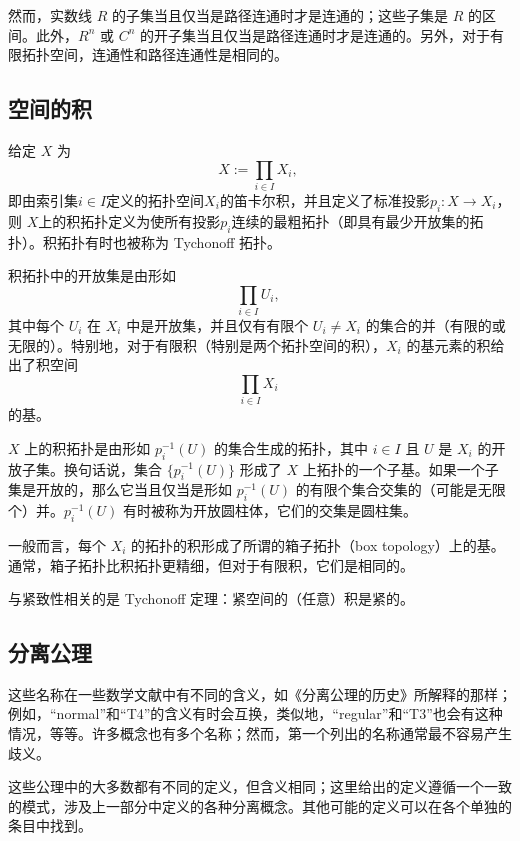 然而，实数线 $R$ 的子集当且仅当是路径连通时才是连通的；这些子集是 $R$ 的区间。此外，$R^n$ 或 $C^n$ 的开子集当且仅当是路径连通时才是连通的。另外，对于有限拓扑空间，连通性和路径连通性是相同的。
\subsection{空间的积}
给定 $X$ 为
$$
X := \prod_{i \in I} X_i,~
$$
即由索引集$i \in I$定义的拓扑空间$X_i$的笛卡尔积，并且定义了标准投影$p_i : X \to X_i$，则 $X$上的积拓扑定义为使所有投影$p_i$连续的最粗拓扑（即具有最少开放集的拓扑）。积拓扑有时也被称为 Tychonoff 拓扑。

积拓扑中的开放集是由形如
$$
\prod_{i \in I} U_i,~
$$
其中每个 $U_i$ 在 $X_i$ 中是开放集，并且仅有有限个 $U_i \neq X_i$ 的集合的并（有限的或无限的）。特别地，对于有限积（特别是两个拓扑空间的积），$X_i$ 的基元素的积给出了积空间
$$
\prod_{i \in I} X_i~
$$
的基。

$X$ 上的积拓扑是由形如 $p_i^{-1}(U)$ 的集合生成的拓扑，其中 $i \in I$ 且 $U$ 是 $X_i$ 的开放子集。换句话说，集合 $\{p_i^{-1}(U)\}$ 形成了 $X$ 上拓扑的一个子基。如果一个子集是开放的，那么它当且仅当是形如 $p_i^{-1}(U)$ 的有限个集合交集的（可能是无限个）并。$p_i^{-1}(U)$ 有时被称为开放圆柱体，它们的交集是圆柱集。

一般而言，每个 $X_i$ 的拓扑的积形成了所谓的箱子拓扑（box topology）上的基。通常，箱子拓扑比积拓扑更精细，但对于有限积，它们是相同的。

与紧致性相关的是 Tychonoff 定理：紧空间的（任意）积是紧的。
\subsection{分离公理}
这些名称在一些数学文献中有不同的含义，如《分离公理的历史》所解释的那样；例如，“normal”和“T4”的含义有时会互换，类似地，“regular”和“T3”也会有这种情况，等等。许多概念也有多个名称；然而，第一个列出的名称通常最不容易产生歧义。

这些公理中的大多数都有不同的定义，但含义相同；这里给出的定义遵循一个一致的模式，涉及上一部分中定义的各种分离概念。其他可能的定义可以在各个单独的条目中找到。

